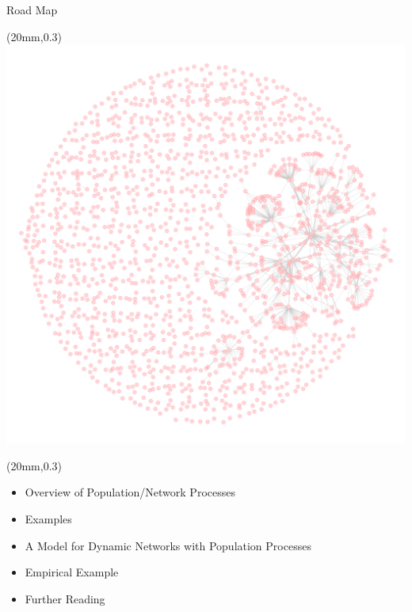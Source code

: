 \documentclass[10pt]{beamer}
\begin{document}
\begin{frame}[t]{Road Map}

\begin{textblock*}{100mm}(20mm,0.3\textheight)
\includegraphics[width=\paperwidth]{graphics/katrinaplot.png}
\end{textblock*}

\begin{textblock*}{100mm}(20mm,0.3\textheight)
\begin{center}
\begin{itemize}
\item[\textbf{1)}] Overview of Population/Network Processes
\item[\textbf{2)}] Examples
\item[\textbf{3)}] A Model for Dynamic Networks with Population Processes
\item[\textbf{4)}] Empirical Example
\item[\textbf{5)}] Further Reading
\end{itemize}
\end{center}
\end{textblock*}


\end{frame}
\end{document}
